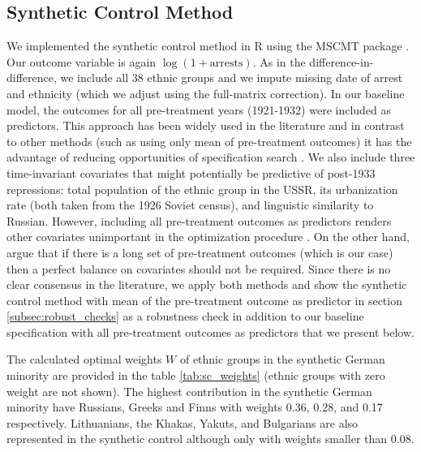 \subsection{Synthetic Control Method}
We implemented the synthetic control method in R  using the MSCMT package \citep{becker_fast_2018}.
Our outcome variable is again $\log\left(1 + \text{arrests}\right)$.
As in the difference-in-difference, we include all 38 ethnic groups and we impute missing date of arrest and ethnicity (which we adjust using the full-matrix correction).
In our baseline model, the  outcomes for all pre-treatment years (1921-1932)  were included  as predictors. 
This approach has been widely used in the literature \citep{billmeier_assessing_2013, cavallo_catastrophic_2013, bohn_did_2014} and in contrast to other methods (such as using only mean of pre-treatment outcomes) it  has the advantage  of reducing opportunities of specification search  \citep{ferman_cherry_2018}. 
We also include three time-invariant covariates that might potentially be predictive of post-1933 repressions: total population of the ethnic group in the USSR, its urbanization rate (both taken from the 1926 Soviet census), and linguistic similarity to Russian. 
However, including all pre-treatment outcomes as predictors  renders  other  covariates unimportant in the optimization procedure \citep{kaul_synthetic_2018}. On the other hand, \citet{botosaru_role_2019} argue that if there is a long set of pre-treatment outcomes (which is our case) then a perfect balance on covariates should not be required.
Since there is no clear consensus in the literature, we apply both methods and show the synthetic control method with mean of the pre-treatment outcome as predictor in section \ref{subsec:robust_checks} as a robustness check in addition to our baseline specification with  all pre-treatment outcomes as predictors that we present below. 



The calculated optimal weights $W$ of ethnic groups in the synthetic German minority are provided in the table \ref{tab:sc_weights} (ethnic groups with zero weight are not shown). The highest contribution in the synthetic German minority have Russians, Greeks and Finns with weights 0.36, 0.28, and 0.17 respectively.  Lithuanians, the Khakas, Yakuts, and Bulgarians  are also represented in the synthetic control although only with  weights smaller than 0.08. 


